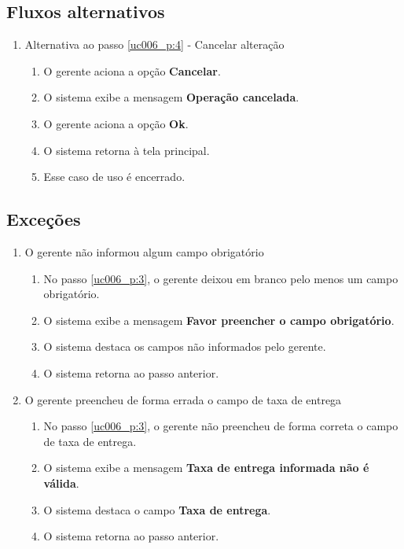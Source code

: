 \subsection{Fluxos alternativos}

\begin{enumerate}[label=A\arabic*]
	\item Alternativa ao passo \ref{uc006_p:4} - Cancelar alteração \label{uc006_a:2}
	\begin{enumerate}[label*=.\arabic*]
		\item O gerente aciona a opção \textbf{Cancelar}.
		\item O sistema exibe a mensagem \textbf{Operação cancelada}.
		\item O gerente aciona a opção \textbf{Ok}.
		\item O sistema retorna à tela principal.
		\item Esse caso de uso é encerrado.
	\end{enumerate}	
\end{enumerate}

\subsection{Exceções}

\begin{enumerate}[label=E\arabic*]	
	\item O gerente não informou algum campo obrigatório \label{uc006_e:1}
	\begin{enumerate}[label*=.\arabic*]
		\item[] No passo \ref{uc006_p:3}, o gerente deixou em branco pelo menos um campo obrigatório.
		\item O sistema exibe a mensagem \textbf{Favor preencher o campo obrigatório}.
		\item O sistema destaca os campos não informados pelo gerente.
		\item O sistema retorna ao passo anterior.
	\end{enumerate}
	
	\item O gerente preencheu de forma errada o campo de taxa de entrega \label{uc006_e:2}
	\begin{enumerate}[label*=.\arabic*]		
		\item[] No passo \ref{uc006_p:3}, o gerente não preencheu de forma correta o campo de taxa de entrega.		
		\item O sistema exibe a mensagem \textbf{Taxa de entrega informada não é válida}.
		\item O sistema destaca o campo \textbf{Taxa de entrega}.
		\item O sistema retorna ao passo anterior.
	\end{enumerate}
\end{enumerate}

